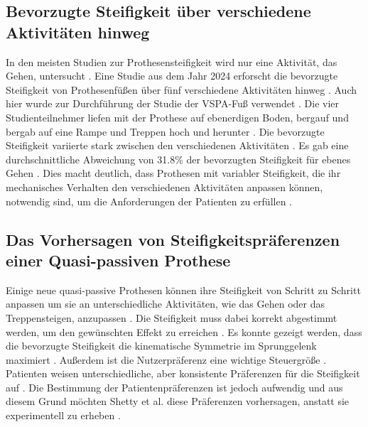 \subsection{Bevorzugte Steifigkeit über verschiedene Aktivitäten hinweg}
In den meisten Studien zur Prothesensteifigkeit wird nur eine Aktivität, das Gehen, untersucht \cite{InstituteofElectricalandElectronicsEngineers.2024}. Eine Studie aus dem Jahr 2024 erforscht die bevorzugte Steifigkeit von Prothesenfüßen über fünf verschiedene Aktivitäten hinweg \cite{InstituteofElectricalandElectronicsEngineers.2024}. Auch hier wurde zur Durchführung der Studie der VSPA-Fuß verwendet \cite{InstituteofElectricalandElectronicsEngineers.2024}. Die vier Studienteilnehmer liefen mit der Prothese auf ebenerdigen Boden, bergauf und bergab auf eine Rampe und Treppen hoch und herunter \cite{InstituteofElectricalandElectronicsEngineers.2024}. Die bevorzugte Steifigkeit variierte stark zwischen den verschiedenen Aktivitäten \cite{InstituteofElectricalandElectronicsEngineers.2024}. Es gab eine durchschnittliche Abweichung von 31.8\% der bevorzugten Steifigkeit für ebenes Gehen \cite{InstituteofElectricalandElectronicsEngineers.2024}. Dies macht deutlich, dass Prothesen mit variabler Steifigkeit, die ihr mechanisches Verhalten den verschiedenen Aktivitäten anpassen können, notwendig sind, um die Anforderungen der Patienten zu erfüllen \cite{InstituteofElectricalandElectronicsEngineers.2024}.

\subsection{Das Vorhersagen von Steifigkeitspräferenzen einer Quasi-passiven Prothese}
Einige neue quasi-passive Prothesen können ihre Steifigkeit von Schritt zu Schritt anpassen um sie an unterschiedliche Aktivitäten, wie das Gehen oder das Treppensteigen, anzupassen \cite{Shetty.2022}. Die Steifigkeit muss dabei korrekt abgestimmt werden, um den gewünschten Effekt zu erreichen \cite{Shetty.2022}. Es konnte gezeigt werden, dass die bevorzugte Steifigkeit die kinematische Symmetrie im Sprunggelenk maximiert \cite{Shetty.2022}. Außerdem ist die Nutzerpräferenz eine wichtige Steuergröße \cite{Shetty.2022}. Patienten weisen unterschiedliche, aber konsistente Präferenzen für die Steifigkeit auf \cite{Shetty.2022}. Die Bestimmung der Patientenpräferenzen ist jedoch aufwendig und aus diesem Grund möchten Shetty et al. diese Präferenzen vorhersagen, anstatt sie experimentell zu erheben \cite{Shetty.2022}. 

